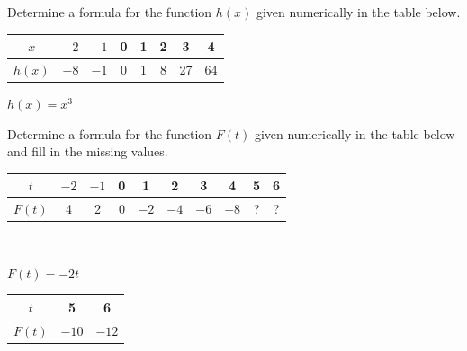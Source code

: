 


\begin{exercise}
Determine a formula for the function $h(x)$ given numerically in the table below.

\begin{center}
\begin{tabular}{|c|c|c|c|c|c|c|c|}
\hline $x$ & $-2$ & $-1$ & 0 & 1 & 2 & 3 & 4 
\\\hline $h(x)$ & $-8$ & $-1$  & 0 & 1 & 8 & 27 & 64 
\\\hline
\end{tabular}
\end{center}

\end{exercise}


\begin{solution}
    $h(x)=x^3$
\end{solution}




\begin{exercise}
Determine a formula for the function $F(t)$ given numerically in the table below and fill in the missing values.

\begin{center}
\begin{tabular}{|c|c|c|c|c|c|c|c|c|c|}
\hline $t$ &$-2$ & $-1$ & 0 & 1 & 2 & 3 & 4 & 5 & 6
\\\hline $F(t)$ & 4 & 2  & 0 & $-2$ & $-4$ & $-6$ & $-8$ & ? & ?
\\\hline
\end{tabular}
\end{center}

\end{exercise}



\begin{solution}
\vspace{10pt}
\\\begin{minipage}[]{0.5\textwidth}
$F(t)=-2t$
\end{minipage}
\begin{minipage}[]{0.5\textwidth}
\begin{center}
\begin{tabular}{|c|c|c|}
\hline
$t$ & 5 & 6 \\
\hline
$F(t)$ &  $-10$ & $-12$ \\
\hline
\end{tabular}
\end{center}
\end{minipage}
\end{solution}



